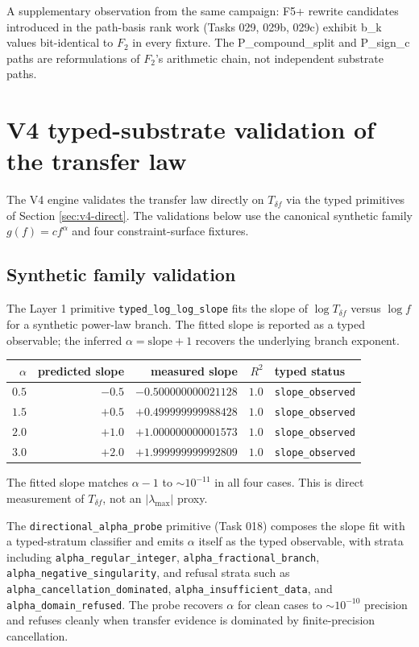 \documentclass[11pt,a4paper]{article}
\begin{document}
A supplementary observation from the same campaign: F5+ rewrite candidates introduced in the path-basis rank work (Tasks 029, 029b, 029c) exhibit b\_k values bit-identical to $F_2$ in every fixture. The P\_compound\_split and P\_sign\_c paths are reformulations of $F_2$'s arithmetic chain, not independent substrate paths.

\section{V4 typed-substrate validation of the transfer law}\label{sec:v4-validation}

The V4 engine validates the transfer law directly on $T_{\delta f}$ via the typed primitives of Section \ref{sec:v4-direct}. The validations below use the canonical synthetic family $g(f)=c f^\alpha$ and four constraint-surface fixtures.

\subsection{Synthetic family validation}

The Layer 1 primitive \texttt{typed\_log\_log\_slope} fits the slope of $\log T_{\delta f}$ versus $\log f$ for a synthetic power-law branch. The fitted slope is reported as a typed observable; the inferred $\alpha = \text{slope} + 1$ recovers the underlying branch exponent.

\begin{center}
\begin{tabular}{rrrrl}
\toprule
$\alpha$ & predicted slope & measured slope & $R^2$ & typed status\\
\midrule
$0.5$ & $-0.5$    & $-0.500000000021128$ & $1.0$ & \texttt{slope\_observed}\\
$1.5$ & $+0.5$    & $+0.499999999988428$ & $1.0$ & \texttt{slope\_observed}\\
$2.0$ & $+1.0$    & $+1.000000000001573$ & $1.0$ & \texttt{slope\_observed}\\
$3.0$ & $+2.0$    & $+1.999999999992809$ & $1.0$ & \texttt{slope\_observed}\\
\bottomrule
\end{tabular}
\end{center}

\noindent
The fitted slope matches $\alpha-1$ to $\sim 10^{-11}$ in all four cases. This is direct measurement of $T_{\delta f}$, not an $|\lambda_{\max}|$ proxy.

The \texttt{directional\_alpha\_probe} primitive (Task 018) composes the slope fit with a typed-stratum classifier and emits $\alpha$ itself as the typed observable, with strata including \texttt{alpha\_regular\_integer}, \texttt{alpha\_fractional\_branch}, \texttt{alpha\_negative\_singularity}, and refusal strata such as \texttt{alpha\_cancellation\_dominated}, \texttt{alpha\_insufficient\_data}, and \texttt{alpha\_domain\_refused}. The probe recovers $\alpha$ for clean cases to $\sim 10^{-10}$ precision and refuses cleanly when transfer evidence is dominated by finite-precision cancellation.
\end{document}
